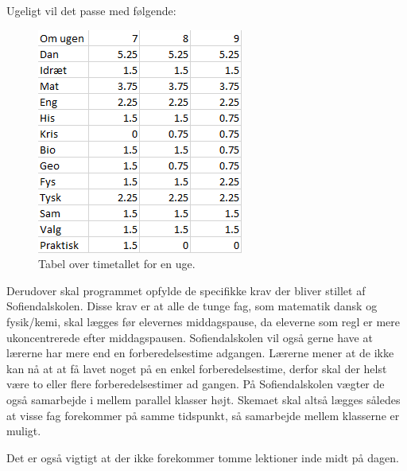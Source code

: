 Ugeligt vil det passe med følgende:
\begin{figure}[!h]
  \centering
  \includegraphics[width=\textwidth]{partials/graphics/antalaftimerpaaenuge.png}
  \caption{Tabel over timetallet for en uge.}
  \label{fig:Timetaluge}
\end{figure}

Derudover skal programmet opfylde de specifikke krav der bliver stillet af Sofiendalskolen. Disse krav er at alle de tunge fag, som matematik dansk og fysik/kemi, skal lægges før elevernes middagspause, da eleverne som regl er mere ukoncentrerede efter middagspausen. Sofiendalskolen vil også gerne have at lærerne har mere end en forberedelsestime adgangen. Lærerne mener at de ikke kan nå at at få lavet noget på en enkel forberedelsestime, derfor skal der helst være to eller flere forberedelsestimer ad gangen. På Sofiendalskolen vægter de også samarbejde i mellem parallel klasser højt. Skemaet skal altså lægges således at visse fag forekommer på samme tidspunkt, så samarbejde mellem klasserne er muligt.

Det er også vigtigt at der ikke forekommer tomme lektioner inde midt på dagen.